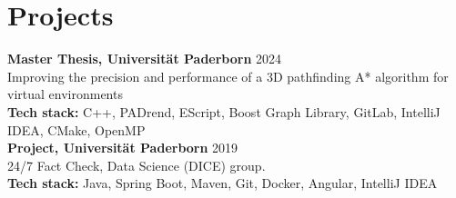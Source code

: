 \documentclass[10pt]{article}   %
\begin{document}
\begin{minipage}[t]{0.67\textwidth}
\section*{Projects}
\textbf{Master Thesis, Universität Paderborn} \hfill 2024 \\
Improving the precision and performance of a 3D pathfinding A* algorithm for virtual environments \\
\textbf{Tech stack:} C++, PADrend, EScript, Boost Graph Library, GitLab, IntelliJ IDEA, CMake, OpenMP\\
\linebreak
\textbf{Project, Universität Paderborn} \hfill 2019 \\
 24/7 Fact Check, Data Science (DICE) group. \\
\textbf{Tech stack:} Java, Spring Boot, Maven, Git, Docker, Angular, IntelliJ IDEA

\end{minipage}
\end{document}
